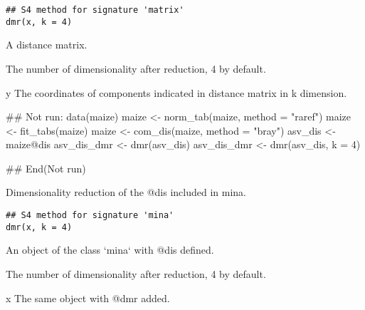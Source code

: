 \documentclass[a4paper]{book}
\begin{document}
%
\begin{Usage}
\begin{verbatim}
## S4 method for signature 'matrix'
dmr(x, k = 4)
\end{verbatim}
\end{Usage}
%
\begin{Arguments}
\begin{ldescription}
\item[\code{x}] A distance matrix.

\item[\code{k}] The number of dimensionality after reduction, 4 by default.
\end{ldescription}
\end{Arguments}
%
\begin{Value}
y The coordinates of components indicated in distance matrix in k
dimension.
\end{Value}
%
\begin{Examples}
\begin{ExampleCode}
## Not run: 
data(maize)
maize <- norm_tab(maize, method = "raref")
maize <- fit_tabs(maize)
maize <- com_dis(maize, method = "bray")
asv_dis <- maize@dis
asv_dis_dmr <- dmr(asv_dis)
asv_dis_dmr <- dmr(asv_dis, k = 4)

## End(Not run)
\end{ExampleCode}
\end{Examples}
%
\begin{Description}\relax
Dimensionality reduction of the @dis included in mina.
\end{Description}
%
\begin{Usage}
\begin{verbatim}
## S4 method for signature 'mina'
dmr(x, k = 4)
\end{verbatim}
\end{Usage}
%
\begin{Arguments}
\begin{ldescription}
\item[\code{x}] An object of the class `mina` with @dis defined.

\item[\code{k}] The number of dimensionality after reduction, 4 by default.
\end{ldescription}
\end{Arguments}
%
\begin{Value}
x The same object with @dmr added.
\end{Value}
\end{document}
